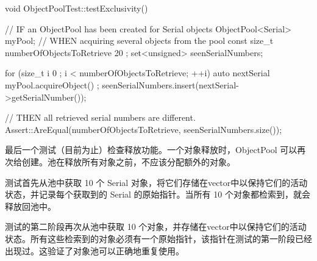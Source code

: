 \begin{cpp}
void ObjectPoolTest::testExclusivity()
{
    // IF an ObjectPool has been created for Serial objects
    ObjectPool<Serial> myPool;
    // WHEN acquiring several objects from the pool
    const size_t numberOfObjectsToRetrieve { 20 };
    set<unsigned> seenSerialNumbers;

    for (size_t i { 0 }; i < numberOfObjectsToRetrieve; ++i) {
        auto nextSerial { myPool.acquireObject() };
        seenSerialNumbers.insert(nextSerial->getSerialNumber());
    }

    // THEN all retrieved serial numbers are different.
    Assert::AreEqual(numberOfObjectsToRetrieve, seenSerialNumbers.size());
}
\end{cpp}

最后一个测试（目前为止）检查释放功能。一个对象释放时，ObjectPool 可以再次给创建。池在释放所有对象之前，不应该分配额外的对象。

测试首先从池中获取 10 个 Serial 对象，将它们存储在vector中以保持它们的活动状态，并记录每个获取到的 Serial 的原始指针。当所有 10 个对象都检索到，就会释放回池中。

测试的第二阶段再次从池中获取 10 个对象，并存储在vector中以保持它们的活动状态。所有这些检索到的对象必须有一个原始指针，该指针在测试的第一阶段已经出现过。这验证了对象池可以正确地重复使用。

